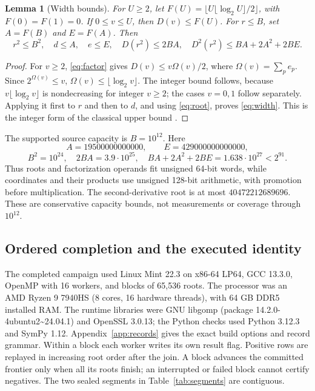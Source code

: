 \documentclass[11pt]{article}
\newtheorem{lemma}[theorem]{Lemma}
\theoremstyle{definition}
\theoremstyle{remark}
\newcommand{\DD}{D^{2}}
\begin{document}
\begin{lemma}[Width bounds]\label{lem:width}
For $U\geq2$, let $F(U)=\lfloor U\lfloor\log_2U\rfloor/2\rfloor$,
with $F(0)=F(1)=0$. If $0\leq v\leq U$, then $D(v)\leq F(U)$.
For $r\leq B$, set $A=F(B)$ and $E=F(A)$. Then
\begin{equation}\label{eq:width}
 r^{2}\leq B^{2},\quad d\leq A,\quad e\leq E,\quad
 D(r^{2})\leq2BA,\quad
 \DD(r^{2})\leq BA+2A^{2}+2BE.
\end{equation}
\end{lemma}
\begin{proof}
For $v\geq2$, \eqref{eq:factor} gives $D(v)\leq v\Omega(v)/2$, where
$\Omega(v)=\sum_pe_p$. Since $2^{\Omega(v)}\leq v$,
$\Omega(v)\leq\lfloor\log_2v\rfloor$. The integer bound follows,
because $v\lfloor\log_2v\rfloor$ is nondecreasing for integer $v\geq2$;
the cases $v=0,1$ follow separately. Applying it first to $r$ and then
to $d$, and using \eqref{eq:root}, proves \eqref{eq:width}.
This is the integer form of the classical upper bound \cite{barbeau}.
\end{proof}

The supported source capacity is $B=10^{12}$. Here
\[
 A=19500000000000,\qquad E=429000000000000,
\]
\[
 B^{2}=10^{24},\quad 2BA=3.9\cdot10^{25},\quad
 BA+2A^{2}+2BE=1.638\cdot10^{27}<2^{91}.
\]
Thus roots and factorization operands fit unsigned 64-bit words, while
coordinates and their products use unsigned 128-bit arithmetic, with
promotion before multiplication. The second-derivative root is at most
$40472212689696$. These are conservative capacity bounds, not
measurements or coverage through $10^{12}$.

\subsection{Ordered completion and the executed identity}\label{sec:provenance}
The completed campaign used Linux Mint 22.3 on x86-64 LP64,
GCC 13.3.0, OpenMP with 16 workers, and blocks of 65,536 roots.
The processor was an AMD Ryzen 9 7940HS (8 cores, 16 hardware threads),
with 64 GB DDR5 installed RAM. The runtime libraries were GNU
libgomp (package 14.2.0-4ubuntu2\textasciitilde24.04.1) and OpenSSL
3.0.13; the Python checks used Python 3.12.3 and SymPy 1.12.
Appendix~\ref{app:records} gives the exact build options and record grammar. Within a block each worker writes its own result
flag. Positive rows are replayed in increasing root order after the
join. A block advances the committed frontier only when all its roots
finish; an interrupted or failed block cannot certify negatives.
The two sealed segments in Table~\ref{tab:segments} are contiguous.
\end{document}
